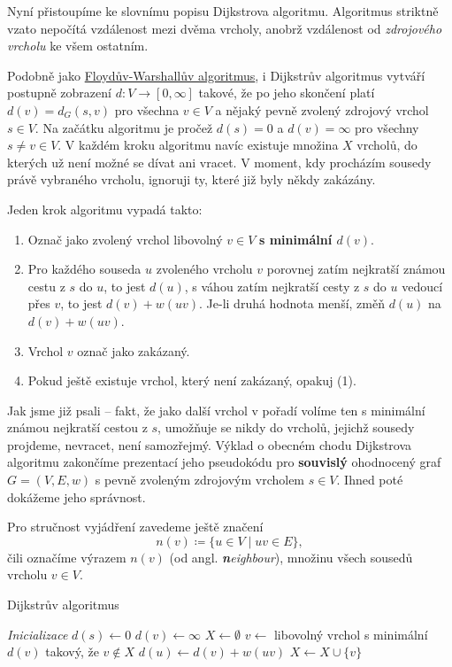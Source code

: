 Nyní přistoupíme ke slovnímu popisu Dijkstrova algoritmu. Algoritmus striktně
vzato nepočítá vzdálenost mezi dvěma vrcholy, anobrž vzdálenost od
\emph{zdrojového vrcholu} ke všem ostatním.

Podobně jako \hyperref[alg:floyd-warshall]{Floydův-Warshallův algoritmus}, i
Dijkstrův algoritmus vytváří postupně zobrazení $d:V \to [0,\infty]$ takové, že
po jeho skončení platí $d(v) = d_G(s,v)$ pro všechna $v \in V$ a nějaký pevně
zvolený zdrojový vrchol $s \in V$. Na začátku algoritmu je pročež $d(s) = 0$ a
$d(v) = \infty$ pro všechny $s \neq v \in V$. V každém kroku algoritmu navíc
existuje množina $X$  vrcholů, do kterých už není možné se dívat
ani vracet. V moment, kdy procházím sousedy právě vybraného vrcholu, ignoruji
ty, které již byly někdy zakázány.

Jeden krok algoritmu vypadá takto:
\begin{enumerate}
 \item Označ jako zvolený vrchol libovolný $v \in V$ \textbf{s minimální
  $d(v)$}.
 \item Pro každého souseda $u$ zvoleného vrcholu $v$ porovnej zatím nejkratší
  známou cestu z $s$ do $u$, to jest $d(u)$, s váhou zatím nejkratší cesty z $s$
  do $u$ vedoucí přes $v$, to jest $d(v) + w(uv)$. Je-li druhá hodnota menší,
  změň $d(u)$ na $d(v) + w(uv)$.
 \item Vrchol $v$ označ jako zakázaný.
 \item Pokud ještě existuje vrchol, který není zakázaný, opakuj (1).
\end{enumerate}

Jak jsme již psali -- fakt, že jako další vrchol v pořadí volíme ten s minimální
známou nejkratší cestou z $s$, umožňuje se nikdy do vrcholů, jejichž sousedy
projdeme, nevracet, není samozřejmý. Výklad o obecném chodu Dijkstrova algoritmu
zakončíme prezentací jeho pseudokódu pro \textbf{souvislý} ohodnocený graf $G =
(V,E,w)$ s pevně zvoleným zdrojovým vrcholem $s \in V$. Ihned poté dokážeme jeho
správnost.

Pro stručnost vyjádření zavedeme ještě značení
\[
 n(v) \coloneqq \{u \in V \mid uv \in E\},
\]
čili označíme výrazem $n(v)$ (od angl. \emph{\textbf{n}eighbour}), množinu všech
sousedů vrcholu $v \in V$.

\begin{algorithm}
 \caption{Dijkstrův algoritmus}
 \label{alg:dijkstra}


 \BlankLine
 \emph{Inicializace}\;
 $d(s) \leftarrow 0$\;
  {
  $d(v) \leftarrow \infty$\;
 }
 $X \leftarrow \emptyset$\;
 \BlankLine
  {
  $v \leftarrow $ libovolný vrchol s minimální $d(v)$ takový, že $v \notin X$\;
   {
    {
    $d(u) \leftarrow d(v) + w(uv)$\;
   }
  }
  $X \leftarrow X \cup \{v\}$\;
 }
 \;
\end{algorithm}
